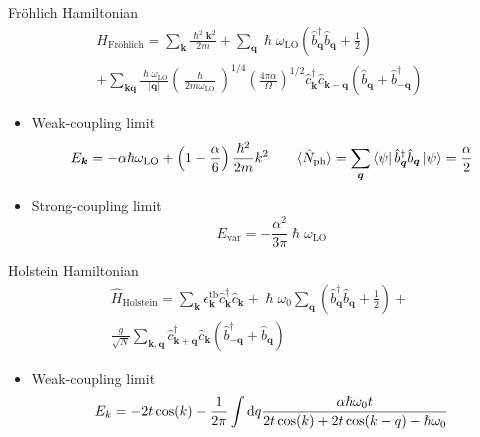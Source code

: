 \documentclass[11pt, xcolor=dvipsnames, aspectratio=43]{beamer}
\newcommand{\oper}[1]{\hat{#1}}
\renewcommand{\vec}[1]{\mathbf{\boldsymbol{#1}}}
\newcommand{\adjoint}[1]{#1^\dagger}
\newcommand{\adjop}[1]{\adjoint{\oper{#1}}}
\begin{document}
\begin{frame}{Fröhlich Hamiltonian}
    \begin{multline*} \label{eq:frohlich_hamiltonian}
        H_\text{Fröhlich} = \sum_{\vec{k}} \frac{\hslash^2\vec{k}^2}{2m}
        + \sum_{\vec{q}} \hslash \omega_\text{LO} \left( \adjop{b}_{ \vec{q}} \oper{b}_{ \vec{q}} + \frac{1}{2} \right)
        \\ + \sum_{\vec{k}\vec{q}} \frac{\hslash \omega_\text{LO}}{|\vec{q}|} \left(\frac{\hslash}{2m\omega_\text{LO}}\right)^{1/4} \left(\frac{4\pi\alpha}{\Omega}\right)^{1/2} \adjop{c}_{\vec{k}}\oper{c}_{\vec{k}-\vec{q}} (\oper{b}_{\vec{q}} + \adjop{b}_{-\vec{q}})
    \end{multline*}
    \begin{itemize}
        \item Weak-coupling limit
              \begin{equation*}
                  E_\vec{k}                           = -\alpha \hslash \omega_\text{LO} + \left(1 - \frac{\alpha}{6}\right)\frac{\hslash^2}{2m}k^2
                  \qquad
                  \langle \oper{N}_\text{ph} \rangle  = \sum_\vec{q} \bra{\psi} \adjop{b}_\vec{q} \oper{b}_\vec{q} \ket{\psi} = \frac{\alpha}{2}
              \end{equation*}
        \item Strong-coupling limit
              \begin{equation*}
                  E_\text{var} = -\frac{\alpha^2}{3\pi} \hslash\omega_\text{LO}
              \end{equation*}
    \end{itemize}
\end{frame}

\begin{frame}{Holstein Hamiltonian}
    \begin{multline*}
        \oper{H}_\text{Holstein} = \sum_{\vec{k}} \epsilon_{\vec{k}}^\text{tb} \adjop{c}_{\vec{k}}\oper{c}_{\vec{k}} + \hslash \omega_0\sum_{\vec{q}}  \left( \adjop{b}_{\vec{q}} \oper{b}_{\vec{q}} + \frac{1}{2} \right) + \\
        \frac{g}{\sqrt{N}}\sum_{\vec{k}, \vec{q}} \adjop{c}_{\vec{k}+\vec{q}} \oper{c}_\vec{k} (\adjop{b}_{-\vec{q}} + \oper{b}_\vec{q})
    \end{multline*}
    \begin{itemize}
        \item Weak-coupling limit
              \begin{equation*}
                  E_k = -2t\cos(k)  - \frac{1}{2\pi}\int \differential q \frac{\alpha \hslash \omega_0 t}{2t\cos(k) +2t\cos(k-q) - \hslash \omega_0 }
              \end{equation*}
    \end{itemize}

\end{frame}
\end{document}
